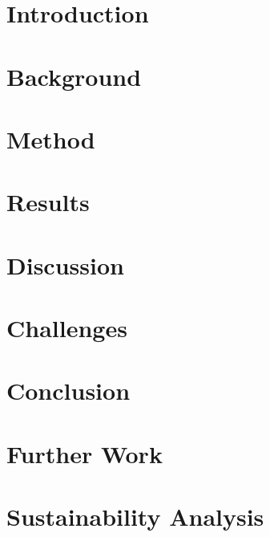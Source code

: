 \documentclass[a4paper, 12pt, openany]{book} %
\begin{document}

\chapter{Introduction}

\cleardoublepage


\chapter{Background}

\cleardoublepage


\chapter{Method}

\cleardoublepage


\chapter{Results}

\cleardoublepage


\chapter{Discussion}

\cleardoublepage

\chapter{Challenges}

\cleardoublepage

\chapter{Conclusion}

\cleardoublepage

\chapter{Further Work}

\cleardoublepage

\chapter{Sustainability Analysis}

\cleardoublepage
\end{document}
